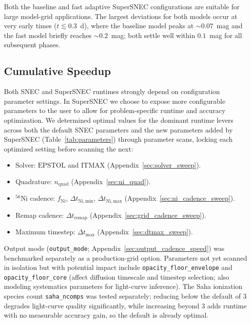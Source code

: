 \documentclass[twocolumn,linenumbers]{aastex701}
\begin{document}
Both the baseline and fast adaptive SuperSNEC configurations are suitable for large model-grid applications. The largest deviations for both models occur at very early times ($t \lesssim 0.3$~d), where the baseline model peaks at ${\sim}0.07$~mag and the fast model briefly reaches ${\sim}0.2$~mag; both settle well within $0.1$~mag for all subsequent phases.


\subsection{Cumulative Speedup}
\label{sec:speed_strategy}
\label{sec:cumulative_speedup}
\label{sec:speed_results}
Both SNEC and SuperSNEC runtimes strongly depend on configuration parameter settings. In SuperSNEC we choose to expose more configurable parameters to the user to allow for problem-specific runtime and accuracy optimization. We determined optimal values for the dominant runtime levers across both the default SNEC parameters and the new parameters added by SuperSNEC (Table~\ref{tab:parameters}) through parameter scans, locking each optimized setting before scanning the next:
\begin{itemize}
\item Solver: $\mathrm{EPSTOL}$ and $\mathrm{ITMAX}$ (Appendix~\ref{sec:solver_sweep}).
\item Quadrature: $n_\mathrm{quad}$ (Appendix~\ref{sec:ni_quad}).
\item $^{56}$Ni cadence: $f_{\mathrm{Ni}}$, $\Delta t_{\mathrm{Ni,min}}$, $\Delta t_{\mathrm{Ni,max}}$ (Appendix~\ref{sec:ni_cadence_sweep}).
\item Remap cadence: $\Delta t_{\mathrm{remap}}$ (Appendix~\ref{sec:grid_cadence_sweep}).
\item Maximum timestep: $\Delta t_{\mathrm{max}}$ (Appendix~\ref{sec:dtmax_sweep}).
\end{itemize}
Output mode (\texttt{output\_mode}; Appendix~\ref{sec:output_cadence_speed}) was benchmarked separately as a production-grid option. Parameters not yet scanned in isolation but with potential impact include \texttt{opacity\_floor\_\-envelope} and \texttt{opacity\_floor\_core} (affect diffusion timescale and timestep selection; also modeling systematics parameters for light-curve inference). The Saha ionization species count \texttt{saha\_ncomps} was tested separately: reducing below the default of 3 degrades light-curve quality significantly, while increasing beyond 3 adds runtime with no measurable accuracy gain, so the default is already optimal.
\end{document}
